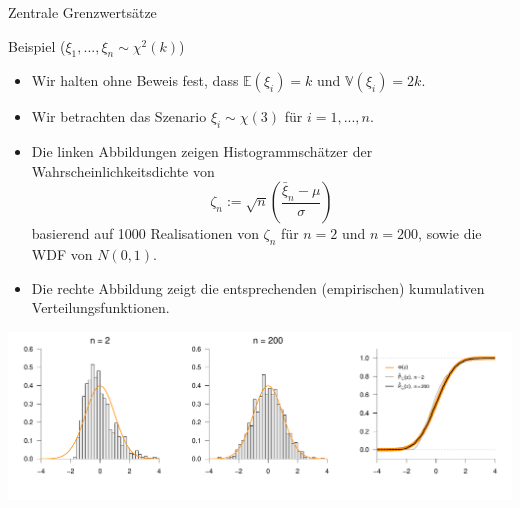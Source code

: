 \documentclass[
  8pt,
  ignorenonframetext,
]{beamer}
\providecommand{\tightlist}{%
  \setlength{\itemsep}{0pt}\setlength{\parskip}{0pt}}
\begin{document}
\begin{frame}{Zentrale Grenzwertsätze}
\protect\hypertarget{zentrale-grenzwertsuxe4tze-3}{}
\small

Beispiel (\(\xi_1,...,\xi_n \sim \chi^2(k)\))

\footnotesize

\begin{itemize}
\tightlist
\item
  Wir halten ohne Beweis fest, dass \(\mathbb{E}(\xi_i) = k\) und
  \(\mathbb{V}(\xi_i) = 2k\).
\item
  Wir betrachten das Szenario \(\xi_i \sim \chi(3)\) für
  \(i = 1,...,n\).
\item
  Die linken Abbildungen zeigen Histogrammschätzer der
  Wahrscheinlichkeitsdichte von \begin{equation}
  \zeta_n := \sqrt{n}\left(\frac{\bar{\xi}_n - \mu}{\sigma}\right)
  \end{equation} basierend auf 1000 Realisationen von \(\zeta_n\) für
  \(n = 2\) und \(n = 200\), sowie die WDF von \(N(0,1)\).
\item
  Die rechte Abbildung zeigt die entsprechenden (empirischen)
  kumulativen Verteilungsfunktionen.
\end{itemize}

\vspace{1mm}

\begin{center}\includegraphics[width=0.95\linewidth]{7_Abbildungen/wtfi_7_lindenberg_levy} \end{center}
\end{frame}
\end{document}
